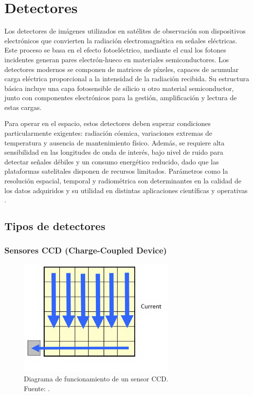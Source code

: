 \section{Detectores}

Los detectores de imágenes utilizados en satélites de observación son dispositivos electrónicos que convierten la radiación electromagnética en señales eléctricas. Este proceso se basa en el efecto fotoeléctrico, mediante el cual los fotones incidentes generan pares electrón-hueco en materiales semiconductores. Los detectores modernos se componen de matrices de píxeles, capaces de acumular carga eléctrica proporcional a la intensidad de la radiación recibida. Su estructura básica incluye una capa fotosensible de silicio u otro material semiconductor, junto con componentes electrónicos para la gestión, amplificación y lectura de estas cargas.

Para operar en el espacio, estos detectores deben superar condiciones particularmente exigentes: radiación cósmica, variaciones extremas de temperatura y ausencia de mantenimiento físico. Además, se requiere alta sensibilidad en las longitudes de onda de interés, bajo nivel de ruido para detectar señales débiles y un consumo energético reducido, dado que las plataformas satelitales disponen de recursos limitados. Parámetros como la resolución espacial, temporal y radiométrica son determinantes en la calidad de los datos adquiridos y su utilidad en distintas aplicaciones científicas y operativas \cite{kuroda_essential_2014}.

\subsection{Tipos de detectores}

\subsubsection{Sensores CCD (Charge-Coupled Device)}

\begin{figure}[H]
    \centering
    \includegraphics[width=0.7\textwidth]{3.Conceptos_Previos/CCD.jpg}
    \caption{Diagrama de funcionamiento de un sensor CCD.\\ Fuente: \cite{ccd_operation_diagram}.}
    \label{fig:CCD}
\end{figure}

